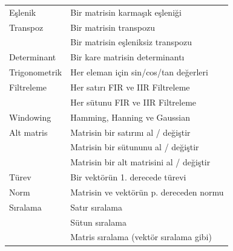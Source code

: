 \begin{longtable}{p{80pt} p{250pt}}
 Eşlenik     						&	Bir matrisin karmaşık eşleniği															\\%
 Transpoz								&	Bir matrisin transpozu																			\\%
 											  &	Bir matrisin eşleniksiz transpozu														\\%
 Determinant						& Bir kare matrisin determinantı															\\%
 Trigonometrik					& Her eleman için sin/cos/tan değerleri 											\\%
 Filtreleme							& Her satırı FIR ve IIR Filtreleme 														\\%
 												& Her sütunu FIR ve IIR Filtreleme 														\\%
 Windowing 							& Hamming, Hanning ve Gaussian 																\\%
 Alt matris 						& Matrisin bir satırını al / değiştir   											\\%
 												& Matrisin bir sütununu al / değiştir													\\%
 												& Matrisin bir alt matrisini al / değiştir										\\%
 Türev									& Bir vektörün 1. derecede türevi															\\%
 Norm 									& Matrisin ve vektörün p. dereceden normu 										\\%
 Sıralama 							& Satır sıralama 																							\\%
 												& Sütun sıralama 																							\\%
 												& Matris sıralama (vektör sıralama gibi) 											\\%

\end{longtable}
